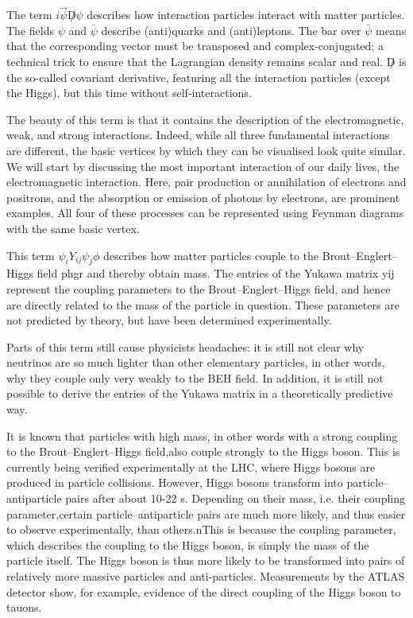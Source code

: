 The term $i\vec{\psi}{\not D} \psi$ describes how interaction particles interact with matter particles. The fields $\psi$ and $\bar{\psi}$  describe (anti)quarks and (anti)leptons. The bar over $\bar{\psi}$  means that the corresponding vector must be transposed and complex-conjugated; a technical trick to ensure that the Lagrangian density remains scalar and real. ${\not D}$  is the so-called covariant derivative, featuring all the interaction particles (except the Higgs), but this time without self-interactions.

The beauty of this term is that it contains the description of the electromagnetic, weak, and strong interactions. Indeed, while all three fundamental interactions are different, the basic vertices by which they can be visualised look quite similar. We will start by discussing the most important interaction of our daily lives, the electromagnetic interaction. Here, pair production or annihilation of electrons and positrons, and the absorption or emission of photons by electrons, are prominent examples. All four of these processes can be represented using Feynman diagrams with the same basic vertex.

This term $\psi_i  Y_{ij} \psi_j \phi$ describes how matter particles couple to the Brout–Englert–Higgs field phgr and thereby obtain mass. The entries of the Yukawa matrix yij represent the coupling parameters to the Brout–Englert–Higgs field, and hence are directly related to the mass of the particle in question. These parameters are not predicted by theory, but have been determined experimentally.

Parts of this term still cause physicists headaches: it is still not clear why neutrinos are so much lighter than other elementary particles, in other words, why they couple only very weakly to the BEH field. In addition, it is still not possible to derive the entries of the Yukawa matrix in a theoretically predictive way.

It is known that particles with high mass, in other words with a strong coupling to the Brout–Englert–Higgs field,also couple strongly to the Higgs boson. This is currently being verified experimentally at the LHC, where Higgs bosons are produced in particle collisions. However, Higgs bosons transform into particle–antiparticle pairs after about 10-22 s. Depending on their mass, i.e. their coupling parameter,certain particle–antiparticle pairs are much more likely, and thus easier to observe experimentally, than others.nThis is because the coupling parameter, which describes the coupling to the Higgs boson, is simply the mass of the particle itself. The Higgs boson is thus more likely to be transformed into pairs of relatively more massive particles and anti-particles. Measurements by the ATLAS detector show, for example, evidence of the direct coupling of the Higgs boson to tauons.

